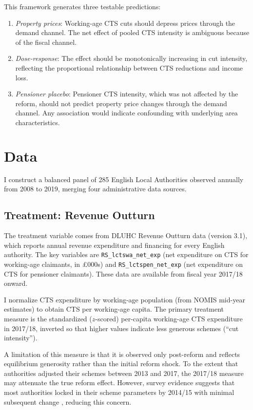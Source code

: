 \documentclass[12pt]{article}
\begin{document}
This framework generates three testable predictions:

\begin{enumerate}
\item \textit{Property prices}: Working-age CTS cuts should depress prices through the demand channel. The net effect of pooled CTS intensity is ambiguous because of the fiscal channel.
\item \textit{Dose-response}: The effect should be monotonically increasing in cut intensity, reflecting the proportional relationship between CTS reductions and income loss.
\item \textit{Pensioner placebo}: Pensioner CTS intensity, which was not affected by the reform, should not predict property price changes through the demand channel. Any association would indicate confounding with underlying area characteristics.
\end{enumerate}

\section{Data}\label{sec:data}

I construct a balanced panel of 285 English Local Authorities observed annually from 2008 to 2019, merging four administrative data sources.

\subsection{Treatment: Revenue Outturn}

The treatment variable comes from DLUHC Revenue Outturn data (version 3.1), which reports annual revenue expenditure and financing for every English authority. The key variables are \texttt{RS\_lctswa\_net\_exp} (net expenditure on CTS for working-age claimants, in \pounds000s) and \texttt{RS\_lctspen\_net\_exp} (net expenditure on CTS for pensioner claimants). These data are available from fiscal year 2017/18 onward.

I normalize CTS expenditure by working-age population (from NOMIS mid-year estimates) to obtain CTS per working-age capita. The primary treatment measure is the standardized ($z$-scored) per-capita working-age CTS expenditure in 2017/18, inverted so that higher values indicate less generous schemes (``cut intensity'').

A limitation of this measure is that it is observed only post-reform and reflects equilibrium generosity rather than the initial reform shock. To the extent that authorities adjusted their schemes between 2013 and 2017, the 2017/18 measure may attenuate the true reform effect. However, survey evidence suggests that most authorities locked in their scheme parameters by 2014/15 with minimal subsequent change \citep{adam2017}, reducing this concern.
\end{document}
